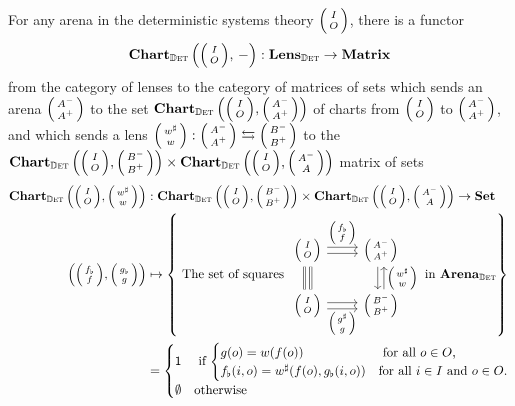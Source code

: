 \documentclass[DynamicalBook]{subfiles}
\begin{document}
\begin{proposition}\label{prop.lens_to_matrix_functor_discrete}
  For any arena in the deterministic systems theory $\lens{I}{O}$, there is a functor
$$\Cat{Chart}_{\determ}\left( \littlelens{I}{O},\, - \right) : \Cat{Lens}_{\determ} \to \Cat{Matrix}$$
from the category of lenses to the category of matrices of sets which sends an
arena $\lens{A^-}{A^+}$ to the set $\Cat{Chart}_{\determ}\left( \lens{I}{O},
  \lens{A^-}{A^+} \right)$ of charts from $\lens{I}{O}$ to $\lens{A^-}{A^+}$,
and which sends a lens $\lens{w^{\sharp}}{w} : \lens{A^-}{A^+} \fromto
\lens{B^-}{B^+}$ to the $\Cat{Chart}_{\determ}\left( \lens{I}{O}, \lens{B^-}{B^+} \right)
\times \Cat{Chart}_{\determ}\left( \lens{I}{O}, \lens{A^-}{A} \right)$ matrix of sets
\begin{align*}
 \Cat{Chart}_{\determ}\left( \littlelens{I}{O}, \littlelens{w^{\sharp}}{w} \right) &: \Cat{Chart}_{\determ}\left( \littlelens{I}{O}, \littlelens{B^-}{B^+} \right)
\times \Cat{Chart}_{\determ}\left( \littlelens{I}{O}, \littlelens{A^-}{A} \right) \to \smset \\
\left( \littlelens{f_{\flat}}{f}, \littlelens{g_{\flat}}{g} \right) &\mapsto \left\{ \mbox{ The set of squares }
      \begin{tikzcd}[ampersand replacement = \&]
        \lens{I}{O} \ar[r, shift left, "\lens{f_{\flat}}{f}"] \ar[r, shift
        right] \ar[d, shift right, equals] \ar[d, shift left,
        leftarrow, equals] \& \lens{A^-}{A^+} \ar[d, shift left, leftarrow,
        "\lens{w^{\sharp}}{w}"] \ar[d, shift right]\\
        \lens{I}{O} \ar[r, shift right, "\lens{g^{\sharp}}{g}"'] \ar[r,
        shift left] \& \lens{B^-}{B^+}
      \end{tikzcd}  \mbox{ in $\Cat{Arena}_{\determ}$}   \right\} \\
&=\begin{cases} \ord{1} &\mbox{ if \(\begin{cases} g(o) = w(f(o)) &\mbox{ for all $o \in O$,}\\ f_{\flat}(i, o) = w^{\sharp}(f(o), g_{\flat}(i, o)) &\mbox{for all $i \in I$ and $o \in O$.}\end{cases}\)} \\ \emptyset &\mbox{otherwise} \end{cases}
\end{align*}
\end{proposition}
\end{document}
